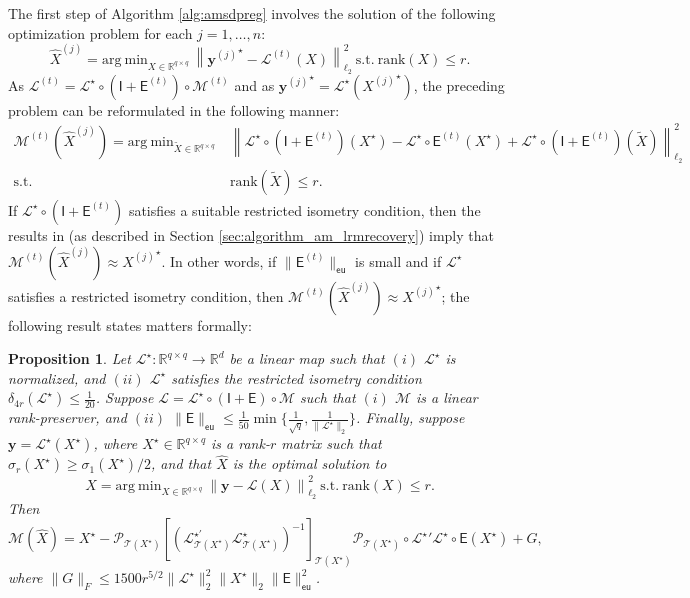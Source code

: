 \documentclass[11pt,letterpaper]{article}
\newtheorem{proposition}[theorem]{Proposition}
\newcommand{\R}{\mathbb{R}}
\newcommand{\by}{\mathbf{y}}
\renewcommand{\L}{\mathcal{L}}
\newcommand{\argmin}{\mathrm{arg~min}}
\newcommand{\ct}{\mathcal{T}}
\newcommand{\cp}{\mathcal{P}}
\newcommand{\sfe}{\mathsf{E}}
\newcommand{\sfi}{\mathsf{I}}
\newcommand{\err}{G}
\newcommand{\eu}{\mathsf{eu}}
\begin{document}
The first step of Algorithm \ref{alg:amsdpreg} involves the solution of the following optimization problem for each $j = 1,\dots,n$:
\begin{equation*}
\hat{X}^{(j)} = \argmin_{X \in \R^{q \times q}} ~ \left\|{\by^{(j)}}^\star - \L^{(t)} (X) \right\|_{\ell_2}^2 ~ \text{s.t.} ~ \mathrm{rank}(X) \leq r.
\end{equation*}
As $\L^{(t)} = \L^\star \circ (\sfi + \sfe^{(t)}) \circ \mathcal{M}^{(t)}$ and as ${\by^{(j)}}^\star = \L^\star \left({X^{(j)}}^\star\right)$, the preceding problem can be reformulated in the following manner:
\begin{equation*}
\begin{aligned}
\mathcal{M}^{(t)}(\hat{X}^{(j)}) = \argmin_{\tilde{X} \in \R^{q \times q}} ~ & \left\|\L^\star \circ (\sfi + \sfe^{(t)})(X^\star) - \L^\star \circ \sfe^{(t)} (X^\star) + \L^\star \circ (\sfi + \sfe^{(t)})(\tilde{X}) \right\|_{\ell_2}^2 \\ \text{s.t.} ~ & \mathrm{rank}(\tilde{X}) \leq r.
\end{aligned}
\end{equation*}
If $\L^{\star} \circ (\sfi + \sfe^{(t)})$ satisfies a suitable restricted isometry condition, then the results in \cite{GM:11,JMD:10} (as described in Section \ref{sec:algorithm_am_lrmrecovery}) imply that
$\mathcal{M}^{(t)}(\hat{X}^{(j)}) \approx {X^{(j)}}^\star$.  In other words, if $\|\sfe^{(t)}\|_{\eu}$ is small and if $\L^\star$ satisfies a restricted isometry condition, then $\mathcal{M}^{(t)}(\hat{X}^{(j)}) \approx {X^{(j)}}^\star$; the following result states matters formally:

\begin{proposition}\label{thm:varietyconstrainederr}
Let $\L^\star : \R^{q \times q} \rightarrow \R^d$ be a linear map such that $(i)$ $\L^\star$ is normalized, and $(ii)$ $\L^\star$ satisfies the restricted isometry condition $\delta_{4r}(\L^{\star}) \leq \frac{1}{20}$.  Suppose $\L = \L^\star \circ (\sfi + \sfe) \circ \mathcal{M}$ such that $(i)$ $\mathcal{M}$ is a linear rank-preserver, and $(ii)$ $\|\sfe\|_{\eu} \leq \frac{1}{50} \min\{\frac{1}{\sqrt{q}}, \frac{1}{\|\L^\star\|_2} \}$. Finally, suppose $\by = \L^\star(X^\star)$, where $X^\star \in \R^{q \times q}$ is a rank-$r$ matrix such that $\sigma_r(X^\star) \geq \sigma_1(X^\star) / 2$, and that $\hat{X}$ is the optimal solution to
\begin{equation} \label{eq:varietyoptimization}
\hat{X} = \argmin_{X \in \R^{q \times q}} ~ \left\|\by - \L(X) \right\|_{\ell_2}^2 ~ \text{s.t.} ~ \mathrm{rank}(X) \leq r.
\end{equation}
Then
\begin{equation*}
\mathcal{M}(\hat{X}) = X^\star -\cp_{\ct(X^\star)}\left[\left({\L^{\star\prime}_{\ct(X^\star)}} \L^\star_{\ct(X^\star)}\right)^{-1} \right]_{\ct(X^\star)}\cp_{\ct(X^\star)} \circ {\L^\star}' \L^\star \circ \sfe \left(X^\star\right) + \err,
\end{equation*}
where $\|\err\|_F \leq 1500 r^{5/2} \|\L^\star\|_2^2 \|X^\star\|_2 \| \sfe \|_{\eu}^2$.
\end{proposition}
\end{document}
